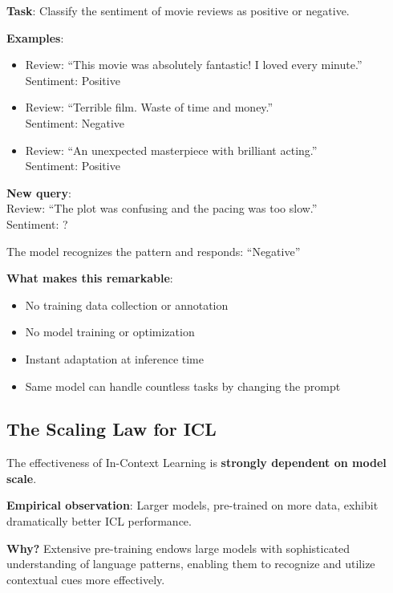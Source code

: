 \documentclass{article}
\begin{document}
\begin{tcolorbox}[colback=gray!5!white, colframe=gray!50!black, title=ICL Prompt]
\textbf{Task}: Classify the sentiment of movie reviews as positive or negative.

\textbf{Examples}:
\begin{itemize}
\item Review: ``This movie was absolutely fantastic! I loved every minute.''\\
Sentiment: Positive
\item Review: ``Terrible film. Waste of time and money.''\\
Sentiment: Negative
\item Review: ``An unexpected masterpiece with brilliant acting.''\\
Sentiment: Positive
\end{itemize}

\textbf{New query}:\\
Review: ``The plot was confusing and the pacing was too slow.''\\
Sentiment: ?
\end{tcolorbox}

The model recognizes the pattern and responds: ``Negative''

\textbf{What makes this remarkable}:
\begin{itemize}
\item No training data collection or annotation
\item No model training or optimization
\item Instant adaptation at inference time
\item Same model can handle countless tasks by changing the prompt
\end{itemize}

\subsection{The Scaling Law for ICL}

\begin{tcolorbox}[colback=blue!5!white, colframe=blue!75!black, title=Critical Finding: ICL and Model Scale]
The effectiveness of In-Context Learning is \textbf{strongly dependent on model scale}.

\textbf{Empirical observation}: Larger models, pre-trained on more data, exhibit dramatically better ICL performance.

\textbf{Why?} Extensive pre-training endows large models with sophisticated understanding of language patterns, enabling them to recognize and utilize contextual cues more effectively.
\end{tcolorbox}
\end{document}
